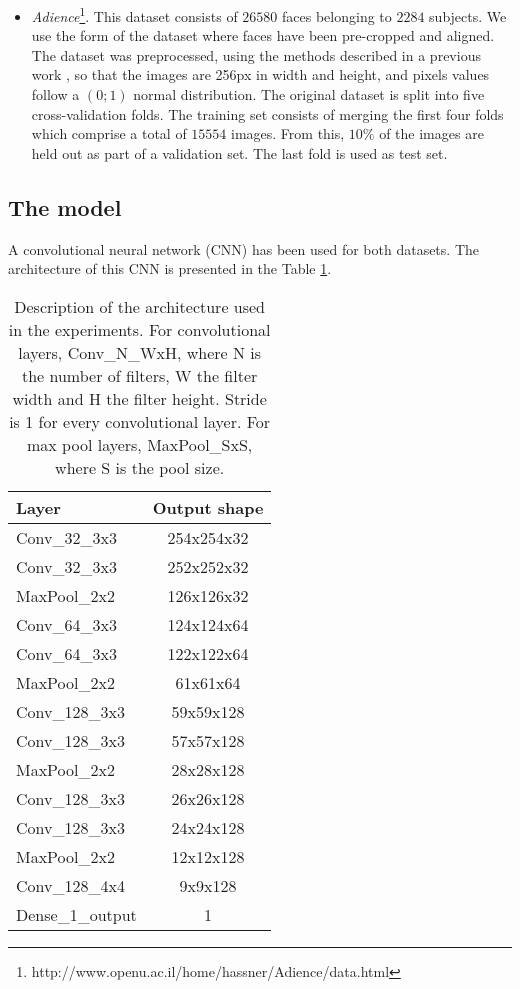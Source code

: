\documentclass[10pt, a4paper, titlepage]{article}
\begin{document}
\begin{multicols}{2}
\begin{itemize}
		\item \textit{Adience}\footnote{http://www.openu.ac.il/home/hassner/Adience/data.html}. This dataset consists of $26580$ faces belonging to $2284$ subjects. We use the form of the dataset where faces have been pre-cropped and aligned. The dataset was preprocessed, using the methods described in a previous work \cite{beckham2017unimodal}, so that the images are 256px in width and height, and pixels values follow a $(0;1)$ normal distribution. The original dataset is split into five cross-validation folds. The training set consists of merging the first four folds which comprise a total of $15554$ images. From this, $10\%$ of the images are held out as part of a validation set. The last fold is used as test set.
	\end{itemize}
	
	\subsection{The model}
	A convolutional neural network (CNN) has been used for both datasets. The architecture of this CNN is presented in the Table \ref{table:CNNArchitecture}.
	
	\begin{table}[H]
		\centering
		\begin{tabular}{|l|c|}
			\hline
			Layer & Output shape\\
			\hline
			Conv\_32\_3x3 & 254x254x32\\\hline
			Conv\_32\_3x3 & 252x252x32\\\hline
			MaxPool\_2x2 & 126x126x32\\\hline
			
			Conv\_64\_3x3 & 124x124x64\\\hline
			Conv\_64\_3x3 & 122x122x64\\\hline
			MaxPool\_2x2 & 61x61x64\\\hline
			
			Conv\_128\_3x3 & 59x59x128\\\hline
			Conv\_128\_3x3 & 57x57x128\\\hline
			MaxPool\_2x2 & 28x28x128\\\hline
			
			Conv\_128\_3x3 & 26x26x128\\\hline
			Conv\_128\_3x3 & 24x24x128\\\hline
			MaxPool\_2x2 & 12x12x128\\\hline
			
			Conv\_128\_4x4 & 9x9x128\\\hline
			Dense\_1\_output & 1\\
			\hline
		\end{tabular}
		\caption{Description of the architecture used in the experiments. For convolutional layers, Conv\_N\_WxH, where N is the number of filters, W the filter width and H the filter height. Stride is 1 for every convolutional layer. For max pool layers, MaxPool\_SxS, where S is the pool size.}
		\label{table:CNNArchitecture}
	\end{table}
	

\end{multicols}
\end{document}
